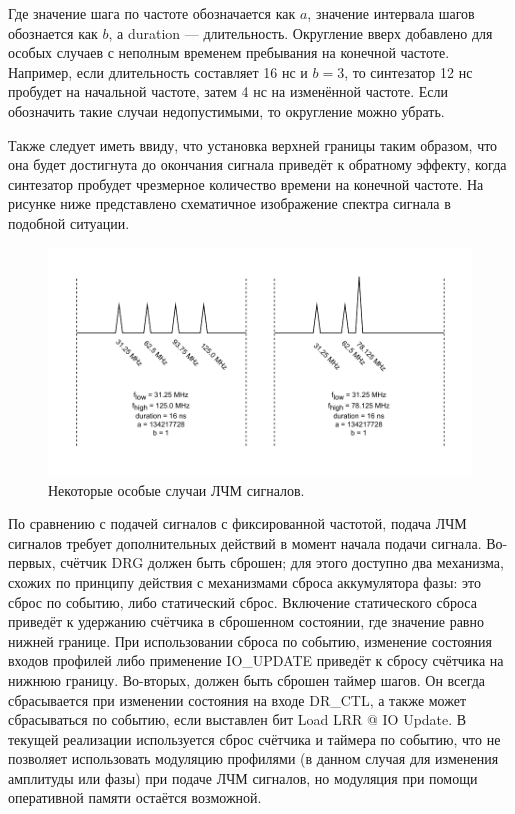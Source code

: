 \documentclass[rusmathsym, eqnumwithinsec, amspack, hyperref]{bomgost}
\begin{document}
Где значение шага по частоте обозначается как $a$, значение интервала шагов обознается как $b$, а duration --- длительность. Округление вверх добавлено для особых случаев с неполным временем пребывания на конечной частоте. Например, если длительность составляет 16 нс и $b=3$, то синтезатор 12 нс пробудет на начальной частоте, затем 4 нс на изменённой частоте. Если обозначить такие случаи недопустимыми, то округление можно убрать.

Также следует иметь ввиду, что установка верхней границы таким образом, что она будет достигнута до окончания сигнала приведёт к обратному эффекту, когда синтезатор пробудет чрезмерное количество времени на конечной частоте. На рисунке ниже представлено схематичное изображение спектра сигнала в подобной ситуации.

%
%
\begin{gostfigure}
\begin{figure}[H]
\centering
\includegraphics{data/sweep_edge_cases.drawio.pdf}
\caption{Некоторые особые случаи ЛЧМ сигналов.}
\label{fig:sweep_edge_cases}
\end{figure}
\end{gostfigure}

По сравнению с подачей сигналов с фиксированной частотой, подача ЛЧМ сигналов требует дополнительных действий в момент начала подачи сигнала. Во-первых, счётчик DRG должен быть сброшен; для этого доступно два механизма, схожих по принципу действия с механизмами сброса аккумулятора фазы: это сброс по событию, либо статический сброс. Включение статического сброса приведёт к удержанию счётчика в сброшенном состоянии, где значение равно нижней границе. При использовании сброса по событию, изменение состояния входов профилей либо применение IO\_UPDATE приведёт к сбросу счётчика на нижнюю границу. Во-вторых, должен быть сброшен таймер шагов. Он всегда сбрасывается при изменении состояния на входе DR\_CTL, а также может сбрасываться по событию, если выставлен бит Load LRR @ IO Update. В текущей реализации используется сброс счётчика и таймера по событию, что не позволяет использовать модуляцию профилями (в данном случая для изменения амплитуды или фазы) при подаче ЛЧМ сигналов, но модуляция при помощи оперативной памяти остаётся возможной.
\end{document}
